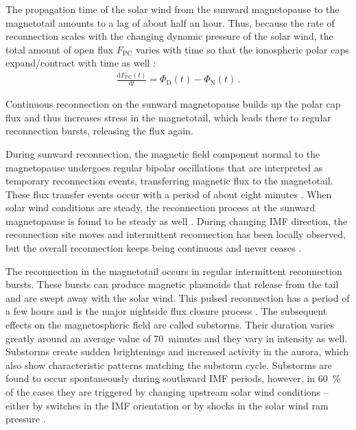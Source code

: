 The propagation time of the solar wind from the sunward magnetopause to the magnetotail amounts to a lag of about half an hour. Thus, because the rate of reconnection scales with the changing dynamic pressure of the solar wind, the total amount of open flux $F_\text{PC}$ varies with time so that the ionospheric polar caps expand/contract with time as well \citep{Siscoe1985}:
\begin{align}
	\frac{\text{d}F_\text{PC}(t)}{\text{d}t} = \Phi_\text{D}(t) - \Phi_\text{N}(t)	\,.	\label{eq:faradays_law}
\end{align}

Continuous reconnection on the sunward magnetopause builds up the polar cap flux and thus increases stress in the magnetotail, which leads there to regular reconnection bursts, releasing the flux again.

During sunward reconnection, the magnetic field component normal to the magnetopause undergoes regular bipolar oscillations that are interpreted as temporary reconnection events, transferring magnetic flux to the magnetotail. These flux transfer events occur with a period of about eight minutes \citep{Russell1996}. When solar wind conditions are steady, the reconnection process at the sunward magnetopause is found to be steady as well \citep{Phan2005}. During changing IMF direction, the reconnection site moves and intermittent reconnection has been locally observed, but the overall reconnection keeps being continuous and never ceases \citep{Phan2005}.

The reconnection in the magnetotail occurs in regular intermittent reconnection bursts. These bursts can produce magnetic plasmoids that release from the tail and are swept away with the solar wind. This pulsed reconnection has a period of a few hours and is the major nightside flux closure process \citep{Milan2007}. The subsequent effects on the magnetospheric field are called substorms. Their duration varies greatly around an average value of 70~minutes and they vary in intensity as well. Substorms create sudden brightenings and increased activity in the aurora, which also show characteristic patterns matching the substorm cycle. Substorms are found to occur spontaneously during southward IMF periods, however, in \SI{60}{\percent} of the cases they are triggered by changing upstream solar wind conditions -- either by switches in the IMF orientation or by shocks in the solar wind ram pressure \citep{Milan2007}.

